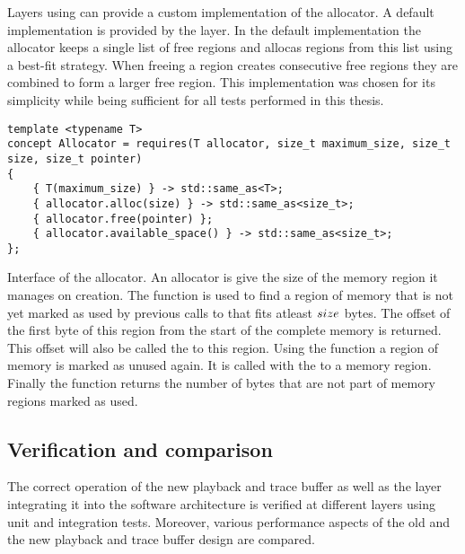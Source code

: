 Layers using \ayo{} can provide a custom implementation of the allocator. A default implementation is provided by the \ayo{} layer. In the default implementation the allocator keeps a single list of free regions and allocas regions from this list using a best-fit strategy. When freeing a region creates consecutive free regions they are combined to form a larger free region. This implementation was chosen for its simplicity while being sufficient for all tests performed in this thesis.
\begin{listing}
\begin{verbatim}
template <typename T>
concept Allocator = requires(T allocator, size_t maximum_size, size_t size, size_t pointer)
{
	{ T(maximum_size) } -> std::same_as<T>;
	{ allocator.alloc(size) } -> std::same_as<size_t>;
	{ allocator.free(pointer) };
	{ allocator.available_space() } -> std::same_as<size_t>;
};
\end{verbatim}
\caption{Interface of the allocator. An allocator is give the size of the memory region it manages on creation. The  function is used to find a region of memory that is not yet marked as used by previous calls to  that fits atleast $\code{size}$ bytes. The offset of the first byte of this region from the start of the complete memory is returned. This offset will also be called the  to this region. Using the  function a region of memory is marked as unused again. It is called with the  to a memory region. Finally the  function returns the number of bytes that are not part of memory regions marked as used.}
\label{listing:allocator_interface}
\end{listing}

\subsection{Verification and comparison}
The correct operation of the new playback and trace buffer as well as the \ayo{} layer integrating it into the \BSSTwo{} software architecture is verified at different layers using unit and integration tests. Moreover, various performance aspects of the old and the new playback and trace buffer design are compared.

